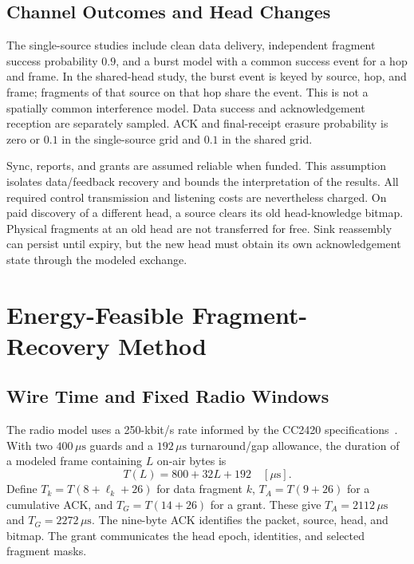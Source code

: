 \documentclass[journal,10pt]{IEEEtran}
\newcommand{\us}{\,\mu\mathrm{s}}
\begin{document}
\subsection{Channel Outcomes and Head Changes}
The single-source studies include clean data delivery, independent fragment success probability $0.9$, and a burst model with a common success event for a hop and frame. In the shared-head study, the burst event is keyed by source, hop, and frame; fragments of that source on that hop share the event. This is not a spatially common interference model. Data success and acknowledgement reception are separately sampled. ACK and final-receipt erasure probability is zero or $0.1$ in the single-source grid and $0.1$ in the shared grid.

Sync, reports, and grants are assumed reliable when funded. This assumption isolates data/feedback recovery and bounds the interpretation of the results. All required control transmission and listening costs are nevertheless charged. On paid discovery of a different head, a source clears its old head-knowledge bitmap. Physical fragments at an old head are not transferred for free. Sink reassembly can persist until expiry, but the new head must obtain its own acknowledgement state through the modeled exchange.

\section{Energy-Feasible Fragment-Recovery Method}
\subsection{Wire Time and Fixed Radio Windows}
The radio model uses a 250-kbit/s rate informed by the CC2420 specifications~\cite{cc2420}. With two $400\us$ guards and a $192\us$ turnaround/gap allowance, the duration of a modeled frame containing $L$ on-air bytes is
\begin{equation}
T(L)=800+32L+192\quad[\mu\mathrm{s}].
\label{eq:wire}
\end{equation}
Define $T_k=T(8+\ell_k+26)$ for data fragment $k$, $T_A=T(9+26)$ for a cumulative ACK, and $T_G=T(14+26)$ for a grant. These give $T_A=2112\us$ and $T_G=2272\us$. The nine-byte ACK identifies the packet, source, head, and bitmap. The grant communicates the head epoch, identities, and selected fragment masks.
\end{document}
